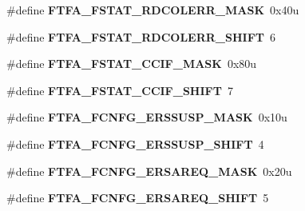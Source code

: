 \begin{DoxyCompactItemize}
\item 
\hypertarget{group___f_t_f_a___register___masks_ga96b65895e79e6256e4312d5677dd8ae2}{}\#define {\bfseries F\+T\+F\+A\+\_\+\+F\+S\+T\+A\+T\+\_\+\+R\+D\+C\+O\+L\+E\+R\+R\+\_\+\+M\+A\+S\+K}~0x40u\label{group___f_t_f_a___register___masks_ga96b65895e79e6256e4312d5677dd8ae2}

\item 
\hypertarget{group___f_t_f_a___register___masks_ga4d4481b6c7d09a3bd6969cdf66a00d75}{}\#define {\bfseries F\+T\+F\+A\+\_\+\+F\+S\+T\+A\+T\+\_\+\+R\+D\+C\+O\+L\+E\+R\+R\+\_\+\+S\+H\+I\+F\+T}~6\label{group___f_t_f_a___register___masks_ga4d4481b6c7d09a3bd6969cdf66a00d75}

\item 
\hypertarget{group___f_t_f_a___register___masks_ga7c3a9f7d0c5882721425d4c46b27a24d}{}\#define {\bfseries F\+T\+F\+A\+\_\+\+F\+S\+T\+A\+T\+\_\+\+C\+C\+I\+F\+\_\+\+M\+A\+S\+K}~0x80u\label{group___f_t_f_a___register___masks_ga7c3a9f7d0c5882721425d4c46b27a24d}

\item 
\hypertarget{group___f_t_f_a___register___masks_ga14a29b83c4f1b2e67a066799a46863f6}{}\#define {\bfseries F\+T\+F\+A\+\_\+\+F\+S\+T\+A\+T\+\_\+\+C\+C\+I\+F\+\_\+\+S\+H\+I\+F\+T}~7\label{group___f_t_f_a___register___masks_ga14a29b83c4f1b2e67a066799a46863f6}

\item 
\hypertarget{group___f_t_f_a___register___masks_ga0fc6d10ebdf1a45172f3c8291fdee94c}{}\#define {\bfseries F\+T\+F\+A\+\_\+\+F\+C\+N\+F\+G\+\_\+\+E\+R\+S\+S\+U\+S\+P\+\_\+\+M\+A\+S\+K}~0x10u\label{group___f_t_f_a___register___masks_ga0fc6d10ebdf1a45172f3c8291fdee94c}

\item 
\hypertarget{group___f_t_f_a___register___masks_ga7586fcfe862202cd864fec542db66458}{}\#define {\bfseries F\+T\+F\+A\+\_\+\+F\+C\+N\+F\+G\+\_\+\+E\+R\+S\+S\+U\+S\+P\+\_\+\+S\+H\+I\+F\+T}~4\label{group___f_t_f_a___register___masks_ga7586fcfe862202cd864fec542db66458}

\item 
\hypertarget{group___f_t_f_a___register___masks_gac92e8d3d354f7352b8bd61086327d16d}{}\#define {\bfseries F\+T\+F\+A\+\_\+\+F\+C\+N\+F\+G\+\_\+\+E\+R\+S\+A\+R\+E\+Q\+\_\+\+M\+A\+S\+K}~0x20u\label{group___f_t_f_a___register___masks_gac92e8d3d354f7352b8bd61086327d16d}

\item 
\hypertarget{group___f_t_f_a___register___masks_ga0879413588f696dfe9f6a1c849103753}{}\#define {\bfseries F\+T\+F\+A\+\_\+\+F\+C\+N\+F\+G\+\_\+\+E\+R\+S\+A\+R\+E\+Q\+\_\+\+S\+H\+I\+F\+T}~5\label{group___f_t_f_a___register___masks_ga0879413588f696dfe9f6a1c849103753}


\end{DoxyCompactItemize}
